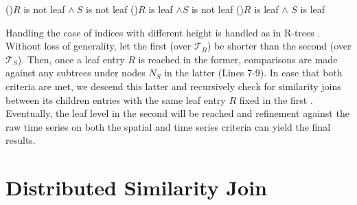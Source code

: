 \begin{algorithm}[!ht]
  \DontPrintSemicolon
  \begin{footnotesize}
  \BlankLine
  \uIf(){$R$ is not leaf $\land \ S$ is not leaf}{
  }
  \uElseIf(){$R$ is leaf $\land S$ is not leaf}{
  }
  \uElseIf(){$R$ is leaf $\land$ $S$ is leaf }{
  }
  \end{footnotesize}
  \caption{$SimJoinBTSR(R, S, \epsilon_{sp}, \epsilon_{ts})$}
  \label{alg:sim_joins_btsr}
\end{algorithm}

Handling the case of \btsr indices with different height is handled as in R-trees \cite{DBLP:conf/sigmod/BrinkhoffKS93}. Without loss of generality, let the first \btsr (over $\mathcal{T}_{R}$) be shorter than the second \btsr (over $\mathcal{T}_{S}$). Then, once a leaf entry $R$ is reached in the former, comparisons are made against any subtrees under nodes $N_S$ in the latter (Lines 7-9). In case that both criteria are met, we descend this latter \btsr and recursively check for similarity joins between its children entries with the same leaf entry $R$ fixed in the first \btsr. Eventually, the leaf level in the second \btsr will be reached and refinement against the raw time series on both the spatial and time series criteria can yield the final results.  

\section{Distributed Similarity Join}
\label{sec:distributed}

